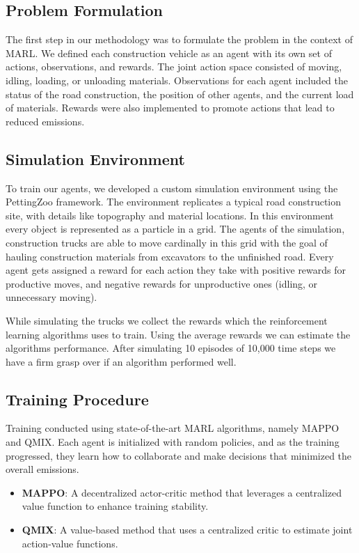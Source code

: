 \documentclass[conference]{IEEEtran}
\begin{document}
\subsection{Problem Formulation}
The first step in our methodology was to formulate the problem in the context of MARL. We defined each construction vehicle as an agent with its own set of actions, observations, and rewards. The joint action space consisted of moving, idling, loading, or unloading materials. Observations for each agent included the status of the road construction, the position of other agents, and the current load of materials. Rewards were also implemented to promote actions that lead to reduced emissions.

\subsection{Simulation Environment}
To train our agents, we developed a custom simulation environment using the PettingZoo framework. The environment replicates a typical road construction site, with details like topography and material locations. In this environment every object is represented as a particle in a grid. 
The agents of the simulation, construction trucks are able to move cardinally in this grid with the goal of hauling construction materials from excavators to the unfinished road. 
Every agent gets assigned a reward for each action they take with positive rewards for productive moves, and negative rewards for unproductive ones (idling, or unnecessary moving). 

While simulating the trucks we collect the rewards which the reinforcement learning algorithms uses to train.
Using the average rewards we can estimate the algorithms performance. After simulating 10 episodes of 10,000 time steps we have a firm grasp over if an algorithm performed well.

\subsection{Training Procedure}
Training conducted using state-of-the-art MARL algorithms, namely MAPPO and QMIX. Each agent is initialized with random policies, and as the training progressed, they learn how to collaborate and make decisions that minimized the overall emissions.

\begin{itemize}
\item \textbf{MAPPO}: A decentralized actor-critic method that leverages a centralized value function to enhance training stability.
\item \textbf{QMIX}: A value-based method that uses a centralized critic to estimate joint action-value functions.
\end{itemize}
\end{document}
